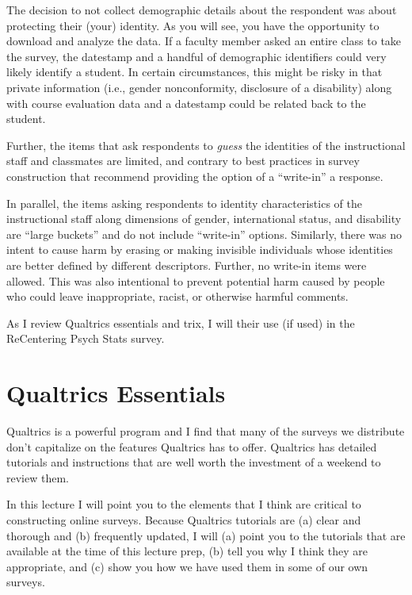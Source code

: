 \documentclass[
  english,
]{book}
\begin{document}
The decision to not collect demographic details about the respondent was about protecting their (your) identity. As you will see, you have the opportunity to download and analyze the data. If a faculty member asked an entire class to take the survey, the datestamp and a handful of demographic identifiers could very likely identify a student. In certain circumstances, this might be risky in that private information (i.e., gender nonconformity, disclosure of a disability) along with course evaluation data and a datestamp could be related back to the student.

Further, the items that ask respondents to \emph{guess} the identities of the instructional staff and classmates are limited, and contrary to best practices in survey construction that recommend providing the option of a ``write-in'' a response.

In parallel, the items asking respondents to identity characteristics of the instructional staff along dimensions of gender, international status, and disability are ``large buckets'' and do not include ``write-in'' options. Similarly, there was no intent to cause harm by erasing or making invisible individuals whose identities are better defined by different descriptors. Further, no write-in items were allowed. This was also intentional to prevent potential harm caused by people who could leave inappropriate, racist, or otherwise harmful comments.

As I review Qualtrics essentials and trix, I will their use (if used) in the ReCentering Psych Stats survey.

\hypertarget{qualtrics-essentials}{%
\section{Qualtrics Essentials}\label{qualtrics-essentials}}

Qualtrics is a powerful program and I find that many of the surveys we distribute don't capitalize on the features Qualtrics has to offer. Qualtrics has detailed tutorials and instructions that are well worth the investment of a weekend to review them.

In this lecture I will point you to the elements that I think are critical to constructing online surveys. Because Qualtrics tutorials are (a) clear and thorough and (b) frequently updated, I will (a) point you to the tutorials that are available at the time of this lecture prep, (b) tell you why I think they are appropriate, and (c) show you how we have used them in some of our own surveys.
\end{document}
